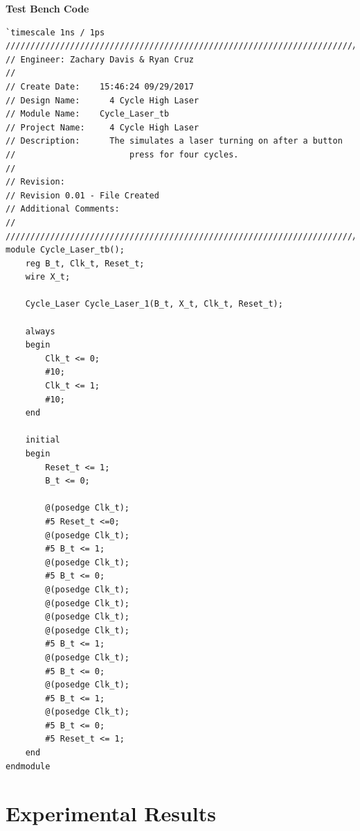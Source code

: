 \documentclass[12pt]{report}
\begin{document}
		\textbf{Test Bench Code}
		\begin{Verbatim}[frame=single, fontsize=\small]
`timescale 1ns / 1ps
////////////////////////////////////////////////////////////////////////////////
// Engineer: Zachary Davis & Ryan Cruz
// 
// Create Date:    15:46:24 09/29/2017 
// Design Name: 	 4 Cycle High Laser
// Module Name:    Cycle_Laser_tb
// Project Name: 	 4 Cycle High Laser
// Description: 	 The simulates a laser turning on after a button
//						 press for four cycles.
//
// Revision: 
// Revision 0.01 - File Created
// Additional Comments: 
//
////////////////////////////////////////////////////////////////////////////////
module Cycle_Laser_tb();
	reg B_t, Clk_t, Reset_t;
	wire X_t;
	
	Cycle_Laser Cycle_Laser_1(B_t, X_t, Clk_t, Reset_t);
	
	always
	begin
		Clk_t <= 0;
		#10;
		Clk_t <= 1;
		#10;
	end
	
	initial
	begin
		Reset_t <= 1;
		B_t <= 0;
		
		@(posedge Clk_t);
		#5 Reset_t <=0;
		@(posedge Clk_t);
		#5 B_t <= 1;
		@(posedge Clk_t);
		#5 B_t <= 0;
		@(posedge Clk_t);
		@(posedge Clk_t);
		@(posedge Clk_t);
		@(posedge Clk_t);
		#5 B_t <= 1;
		@(posedge Clk_t);
		#5 B_t <= 0;
		@(posedge Clk_t);
		#5 B_t <= 1;
		@(posedge Clk_t);
		#5 B_t <= 0;
		#5 Reset_t <= 1;
	end
endmodule
		\end{Verbatim}
		\vspace{4cm}

	
\section*{Experimental Results}
	
\end{document}
